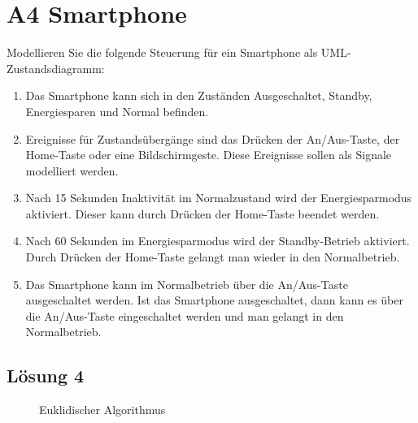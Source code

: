 \documentclass[main.tex]{subfiles}
\begin{document}
\section{A4 Smartphone}
Modellieren Sie die folgende Steuerung für ein Smartphone als UML-Zustandsdiagramm:

\begin{enumerate}
    \item Das Smartphone kann sich in den Zuständen Ausgeschaltet, Standby, Energiesparen und Normal befinden.
    \item Ereignisse für Zustandsübergänge sind das Drücken der An/Aus-Taste, der Home-Taste oder eine Bildschirmgeste. Diese Ereignisse sollen als Signale modelliert werden.
    \item Nach 15 Sekunden Inaktivität im Normalzustand wird der Energiesparmodus aktiviert. Dieser kann durch Drücken der Home-Taste beendet werden.
    \item Nach 60 Sekunden im Energiesparmodus wird der Standby-Betrieb aktiviert. Durch Drücken der Home-Taste gelangt man wieder in den Normalbetrieb.
    \item Das Smartphone kann im Normalbetrieb über die An/Aus-Taste ausgeschaltet werden. Ist das Smartphone ausgeschaltet, dann kann es über die An/Aus-Taste eingeschaltet werden und man gelangt in den Normalbetrieb.
\end{enumerate}

\subsection{Lösung 4}

\begin{figure}[h!]
    \caption{Euklidischer Algorithmus}
    \label{fig:lgs4}
\end{figure}
\end{document}
